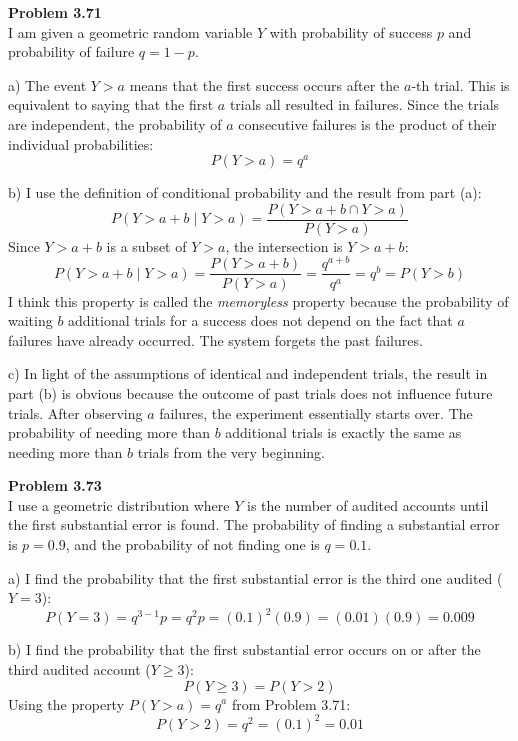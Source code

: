 \documentclass[12pt]{article}
\begin{document}
\textbf{Problem 3.71} \\
I am given a geometric random variable $Y$ with probability of success $p$ and probability of failure $q = 1 - p$.

a) The event $Y > a$ means that the first success occurs after the $a$-th trial. This is equivalent to saying that the first $a$ trials all resulted in failures. Since the trials are independent, the probability of $a$ consecutive failures is the product of their individual probabilities:
\[ P(Y > a) = q^a \]

b) I use the definition of conditional probability and the result from part (a):
\[ P(Y > a + b \mid Y > a) = \frac{P(Y > a + b \cap Y > a)}{P(Y > a)} \]
Since $Y > a + b$ is a subset of $Y > a$, the intersection is $Y > a + b$:
\[ P(Y > a + b \mid Y > a) = \frac{P(Y > a + b)}{P(Y > a)} = \frac{q^{a+b}}{q^a} = q^b = P(Y > b) \]
I think this property is called the \textit{memoryless} property because the probability of waiting $b$ additional trials for a success does not depend on the fact that $a$ failures have already occurred. The system forgets the past failures.

c) In light of the assumptions of identical and independent trials, the result in part (b) is obvious because the outcome of past trials does not influence future trials. After observing $a$ failures, the experiment essentially starts over. The probability of needing more than $b$ additional trials is exactly the same as needing more than $b$ trials from the very beginning.

\textbf{Problem 3.73} \\
I use a geometric distribution where $Y$ is the number of audited accounts until the first substantial error is found. The probability of finding a substantial error is $p = 0.9$, and the probability of not finding one is $q = 0.1$.

a) I find the probability that the first substantial error is the third one audited ($Y = 3$):
\[ P(Y = 3) = q^{3-1}p = q^2p = (0.1)^2(0.9) = (0.01)(0.9) = 0.009 \]

b) I find the probability that the first substantial error occurs on or after the third audited account ($Y \geq 3$):
\[ P(Y \geq 3) = P(Y > 2) \]
Using the property $P(Y > a) = q^a$ from Problem 3.71:
\[ P(Y > 2) = q^2 = (0.1)^2 = 0.01 \]
\end{document}
